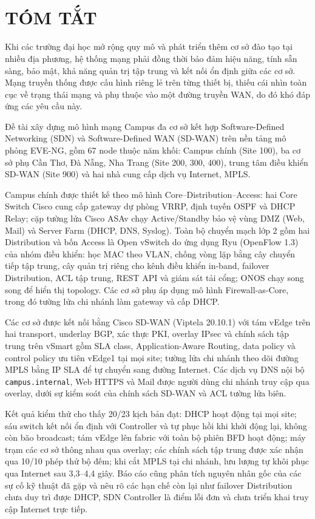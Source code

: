 \section*{\fontsize{18pt}{18pt}\selectfont\MakeUppercase{\de}\\TÓM TẮT}

Khi các trường đại học mở rộng quy mô và phát triển thêm cơ sở đào tạo tại nhiều địa phương, hệ thống mạng phải đồng thời bảo đảm hiệu năng, tính sẵn sàng, bảo mật, khả năng quản trị tập trung và kết nối ổn định giữa các cơ sở. Mạng truyền thống được cấu hình riêng lẻ trên từng thiết bị, thiếu cái nhìn toàn cục về trạng thái mạng và phụ thuộc vào một đường truyền WAN, do đó khó đáp ứng các yêu cầu này.

Đề tài xây dựng mô hình mạng Campus đa cơ sở kết hợp Software-Defined Networking (SDN) và Software-Defined WAN (SD-WAN) trên nền tảng mô phỏng EVE-NG, gồm 67 node thuộc năm khối: Campus chính (Site 100), ba cơ sở phụ Cần Thơ, Đà Nẵng, Nha Trang (Site 200, 300, 400), trung tâm điều khiển SD-WAN (Site 900) và hai nhà cung cấp dịch vụ Internet, MPLS.

Campus chính được thiết kế theo mô hình Core--Distribution--Access: hai Core Switch Cisco cung cấp gateway dự phòng VRRP, định tuyến OSPF và DHCP Relay; cặp tường lửa Cisco ASAv chạy Active/Standby bảo vệ vùng DMZ (Web, Mail) và Server Farm (DHCP, DNS, Syslog). Toàn bộ chuyển mạch lớp 2 gồm hai Distribution và bốn Access là Open vSwitch do ứng dụng Ryu (OpenFlow 1.3) của nhóm điều khiển: học MAC theo VLAN, chống vòng lặp bằng cây chuyển tiếp tập trung, cây quản trị riêng cho kênh điều khiển in-band, failover Distribution, ACL tập trung, REST API và giám sát tải cổng; ONOS chạy song song để hiển thị topology. Các cơ sở phụ áp dụng mô hình Firewall-as-Core, trong đó tường lửa chi nhánh làm gateway và cấp DHCP.

Các cơ sở được kết nối bằng Cisco SD-WAN (Viptela 20.10.1) với tám vEdge trên hai transport, underlay BGP, xác thực PKI, overlay IPsec và chính sách tập trung trên vSmart gồm SLA class, Application-Aware Routing, data policy và control policy ưu tiên vEdge1 tại mọi site; tường lửa chi nhánh theo dõi đường MPLS bằng IP SLA để tự chuyển sang đường Internet. Các dịch vụ DNS nội bộ \texttt{campus.internal}, Web HTTPS và Mail được người dùng chi nhánh truy cập qua overlay, dưới sự kiểm soát của chính sách SD-WAN và ACL tường lửa biên.

Kết quả kiểm thử cho thấy 20/23 kịch bản đạt: DHCP hoạt động tại mọi site; sáu switch kết nối ổn định với Controller và tự phục hồi khi khởi động lại, không còn bão broadcast; tám vEdge lên fabric với toàn bộ phiên BFD hoạt động; máy trạm các cơ sở thông nhau qua overlay; các chính sách tập trung được xác nhận qua 10/10 phép thử bộ đếm; khi cắt MPLS tại chi nhánh, lưu lượng tự khôi phục qua Internet sau 3,3--4,4 giây. Báo cáo cũng phân tích nguyên nhân gốc của các sự cố kỹ thuật đã gặp và nêu rõ các hạn chế còn lại như failover Distribution chưa duy trì được DHCP, SDN Controller là điểm lỗi đơn và chưa triển khai truy cập Internet trực tiếp.

